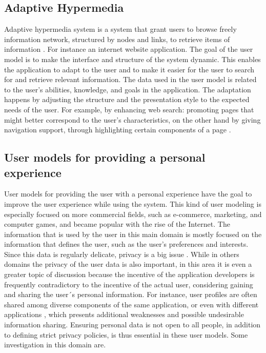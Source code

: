 \subsection{Adaptive Hypermedia}

Adaptive hypermedia system is a system that grant users to browse freely
information network, structured by nodes and links, to retrieve items of
information \cite{deepa2012adaptive}. For instance an internet website
application. The goal of the user model is to make the interface and structure
of the system dynamic. This enables the application to adapt to the user and to
make it easier for the user to search for and retrieve relevant information.
The data used in the user model is related to the user’s abilities, knowledge,
and goals in the application. The adaptation happens by adjusting the structure
and the presentation style to the expected needs of the user. For example, by
enhancing web search: promoting pages that might better correspond to the user’s
characteristics, on the other hand by giving navigation support, through
highlighting certain components of a page \cite{razmerita2012user}.

\subsection{User models for providing a personal experience}

User models for providing the user with a personal experience have the goal to
improve the user experience while using the system. This kind of user modeling
is especially focused on more commercial fields, such as e-commerce, marketing,
and computer games, and became popular with the rise of the Internet. The
information that is used by the user in this main domain is mostly focused on
the information that defines the user, such as the user’s preferences and
interests. Since this data is regularly delicate, privacy is a big issue
\cite{toch2012personalization}. While in others domains the privacy of the user
data is also important, in this area it is even a greater topic of discussion
because the incentive of the application developers is frequently contradictory
to the incentive of the actual user, considering gaining and sharing the user´s
personal information. For instance, user profiles are often shared among diverse
components of the same application, or even with different applications
\cite{brun2010compass} \cite{karam2012modeling}, which presents additional
weaknesses and possible undesirable information sharing. Ensuring personal data
is not open to all people, in addition to defining strict privacy policies, is
thus essential in these user models. Some investigation in this domain are.

